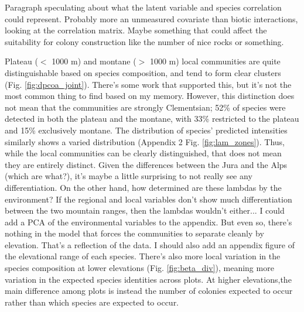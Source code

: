 \documentclass[preprint,review,times,12pt,3p]{elsarticle}
\begin{document}
Paragraph speculating about what the latent variable and species correlation could represent. Probably more an unmeasured covariate than biotic interactions, looking at the correlation matrix. Maybe something that could affect the suitability for colony construction like the number of nice rocks or something. 

Plateau ($<$ 1000 m) and montane ($>$ 1000 m) local communities are quite distinguishable based on species composition, and tend to form clear clusters (Fig. \ref{fig:dpcoa_joint}). There's some work that supported this, but it's not the most common thing to find based on my memory. However, this distinction does not mean that the communities are strongly Clementsian; 52\% of species were detected in both the plateau and the montane, with 33\% restricted to the plateau and 15\% exclusively montane. The distribution of species' predicted intensities similarly shows a varied distribution (Appendix 2 Fig. \ref{fig:lam_zones}). Thus, while the local communities can be clearly distinguished, that does not mean they are entirely distinct. Given the differences between the Jura and the Alps (which are what?), it's maybe a little surprising to not really see any differentiation. On the other hand, how determined are these lambdas by the environment? If the regional and local variables don't show much differentiation between the two mountain ranges, then the lambdas wouldn't either... I could add a PCA of the environmental variables to the appendix. But even so, there's nothing in the model that forces the communities to separate cleanly by elevation. That's a reflection of the data. I should also add an appendix figure of the elevational range of each species. There's also more local variation in the species composition at lower elevations (Fig. \ref{fig:beta_div}), meaning more variation in the expected species identities across plots. At higher elevations,the main difference among plots is instead the number of colonies expected to occur rather than which species are expected to occur.
\end{document}
